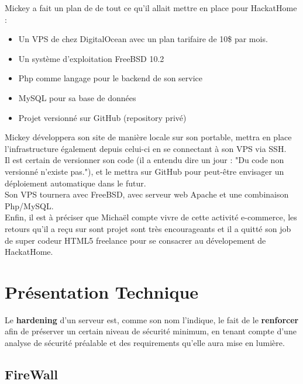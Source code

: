 \documentclass[a4paper,10pt,final,fleqn]{article}
\begin{document}
			Mickey a fait un plan de de tout ce qu'il allait mettre en place pour HackatHome : \\

			\begin{itemize}
				\item Un VPS de chez DigitalOcean avec un plan tarifaire de 10\$ par mois.
				\item Un système d'exploitation FreeBSD 10.2
				\item Php comme langage pour le backend de son service
				\item MySQL pour sa base de données
				\item Projet versionné sur GitHub (repository privé)\\
				
			\end{itemize}

			Mickey développera son site de manière locale sur son portable, mettra en place l'infrastructure également depuis celui-ci en se connectant à son VPS via SSH.\\
			Il est certain de versionner son code (il a entendu dire un jour : "Du code non versionné n'existe pas."), et le mettra sur GitHub pour peut-être envisager un déploiement automatique dans le futur.\\
			Son VPS tournera avec FreeBSD, avec serveur web Apache et une combinaison Php/MySQL.\\

			Enfin, il est à préciser que Michaël compte vivre de cette activité e-commerce, les retours qu'il a reçu sur sont projet sont très encourageants et il a quitté son job de super codeur HTML5 freelance pour se consacrer au dévelopement de HackatHome.\\

		\section{Présentation Technique}

			Le \textbf{hardening} d'un serveur est, comme son nom l'indique, le fait de le \textbf{renforcer} afin de préserver un certain niveau de sécurité minimum, en tenant compte d'une analyse de sécurité préalable et des requirements qu'elle aura mise en lumière.\\

			\subsection{FireWall}
\end{document}
